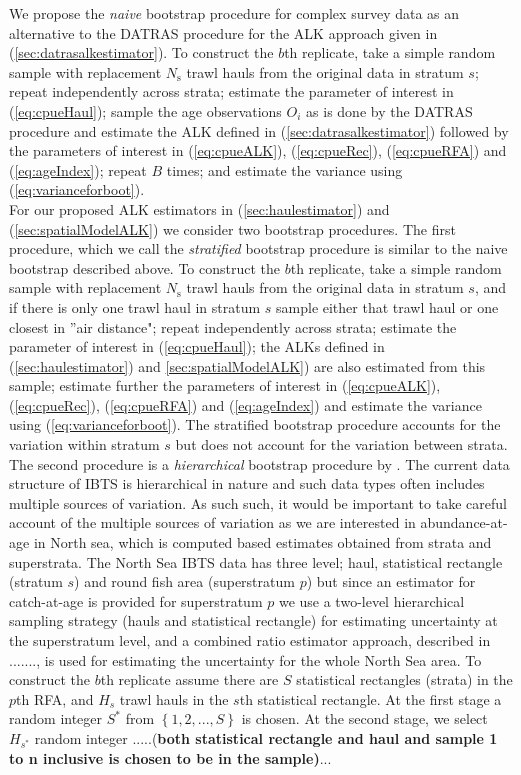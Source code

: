 \documentclass[a4paper 12pt]{article}
\numberwithin{equation}{section}
\begin{document}
\indent We propose the \emph{naive} bootstrap procedure \citep{kolenikov2010resampling} for complex survey data as an alternative to the DATRAS procedure for the ALK approach given in (\ref{sec:datrasalkestimator}). To construct the $b$th replicate, take a simple random sample with replacement  $N_{\text{s}}$ trawl hauls from the original data in stratum $s$; repeat independently across strata; estimate the parameter of interest in (\ref{eq:cpueHaul}); sample the age observations  $O_i$  as is done by the DATRAS procedure and estimate the ALK defined in (\ref{sec:datrasalkestimator}) followed by the parameters of interest in (\ref{eq:cpueALK}), (\ref{eq:cpueRec}), (\ref{eq:cpueRFA}) and (\ref{eq:ageIndex}); repeat $B$ times; and estimate the variance using (\ref{eq:varianceforboot}). \\
\indent For our proposed ALK estimators in (\ref{sec:haulestimator}) and (\ref{sec:spatialModelALK}) we consider two bootstrap procedures. The first procedure, which we call the \emph{stratified} bootstrap procedure is similar to the naive bootstrap described above. To construct the $b$th replicate, take a simple random sample with replacement  $N_{\text{s}}$ trawl hauls from the original data in stratum $s$, and if there is only one trawl haul in stratum $s$ sample either that trawl haul or one closest in ''air distance"; repeat independently across strata; estimate the parameter of interest in (\ref{eq:cpueHaul}); the ALKs defined in (\ref{sec:haulestimator}) and \ref{sec:spatialModelALK}) are also estimated from this sample; estimate further the parameters of interest in (\ref{eq:cpueALK}), (\ref{eq:cpueRec}), (\ref{eq:cpueRFA}) and (\ref{eq:ageIndex}) and estimate the variance using (\ref{eq:varianceforboot}). The stratified bootstrap procedure accounts for the variation within stratum $s$ but does not account for the variation between strata. \\
\indent  The second procedure is a \emph{hierarchical} bootstrap procedure by \citep{ren2010nonparametric}. The current data structure of IBTS is hierarchical in nature and such data types often includes multiple sources of variation. As such such, it would be important to take careful account of the multiple sources of variation as we are interested in abundance-at-age in North sea, which is computed based estimates obtained from strata and superstrata. The North Sea IBTS data has three level; haul, statistical rectangle (stratum $s$) and round fish area (superstratum $p$) but since an estimator for catch-at-age is provided for superstratum $p$ we use a two-level hierarchical sampling strategy (hauls and statistical rectangle) for estimating uncertainty at the superstratum level, and a combined ratio estimator approach, described in ......., is used for estimating the uncertainty for the whole North Sea area. To construct the $b$th replicate assume there are $S$ statistical rectangles (strata) in the $p$th RFA, and $H_{s}$ trawl hauls in the $s$th statistical rectangle. At the first stage a random integer $S^{*}$ from $\left\{1,2,..., S \right\}$ is chosen. At the second stage, we select $H_{s^{*}}$ random integer .....({\bf both statistical rectangle and haul and sample 1 to n inclusive is chosen to be in the sample)}... \\
\end{document}
